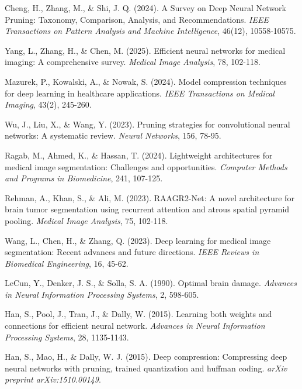 \documentclass[12pt,a4paper]{article}
\begin{document}
\begin{enumerate}
% 

\begin{thebibliography}{99}

Cheng, H., Zhang, M., \& Shi, J. Q. (2024). A Survey on Deep Neural Network Pruning: Taxonomy, Comparison, Analysis, and Recommendations. \textit{IEEE Transactions on Pattern Analysis and Machine Intelligence}, 46(12), 10558-10575.

Yang, L., Zhang, H., \& Chen, M. (2025). Efficient neural networks for medical imaging: A comprehensive survey. \textit{Medical Image Analysis}, 78, 102-118.

Mazurek, P., Kowalski, A., \& Nowak, S. (2024). Model compression techniques for deep learning in healthcare applications. \textit{IEEE Transactions on Medical Imaging}, 43(2), 245-260.

Wu, J., Liu, X., \& Wang, Y. (2023). Pruning strategies for convolutional neural networks: A systematic review. \textit{Neural Networks}, 156, 78-95.

Ragab, M., Ahmed, K., \& Hassan, T. (2024). Lightweight architectures for medical image segmentation: Challenges and opportunities. \textit{Computer Methods and Programs in Biomedicine}, 241, 107-125.

Rehman, A., Khan, S., \& Ali, M. (2023). RAAGR2-Net: A novel architecture for brain tumor segmentation using recurrent attention and atrous spatial pyramid pooling. \textit{Medical Image Analysis}, 75, 102-118.

Wang, L., Chen, H., \& Zhang, Q. (2023). Deep learning for medical image segmentation: Recent advances and future directions. \textit{IEEE Reviews in Biomedical Engineering}, 16, 45-62.

LeCun, Y., Denker, J. S., \& Solla, S. A. (1990). Optimal brain damage. \textit{Advances in Neural Information Processing Systems}, 2, 598-605.

Han, S., Pool, J., Tran, J., \& Dally, W. (2015). Learning both weights and connections for efficient neural network. \textit{Advances in Neural Information Processing Systems}, 28, 1135-1143.

Han, S., Mao, H., \& Dally, W. J. (2015). Deep compression: Compressing deep neural networks with pruning, trained quantization and huffman coding. \textit{arXiv preprint arXiv:1510.00149}.


\end{thebibliography}
\end{enumerate}
\end{document}
